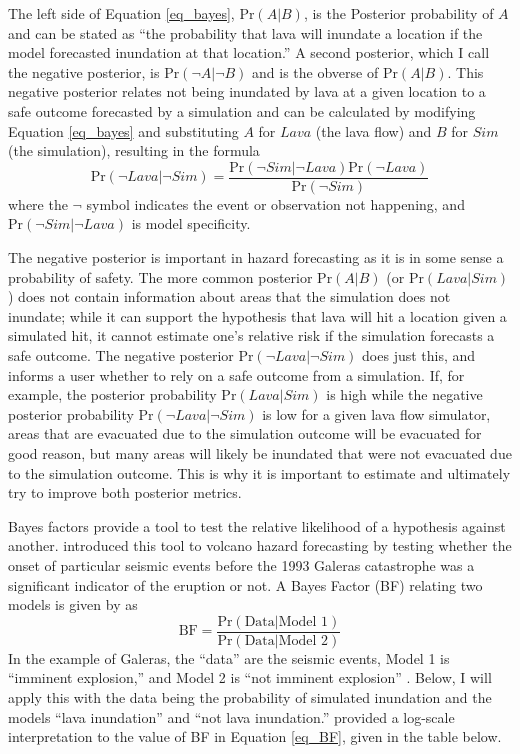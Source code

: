 \documentclass[12pt,letter]{article}
\begin{document}
	The left side of Equation \ref{eq_bayes}, $\text{Pr}(A|B)$, is the Posterior probability of $A$ and can be stated as ``the probability that lava will inundate a location if the model forecasted inundation at that location.'' A second posterior, which I call the negative posterior, is $\text{Pr}(\neg A|\neg B)$ and is the obverse of $\text{Pr}(A|B)$. This negative posterior relates not being inundated by lava at a given location to a safe outcome forecasted by a simulation and can be calculated by modifying Equation \ref{eq_bayes} and substituting $A$ for $Lava$ (the lava flow) and $B$ for $Sim$ (the simulation), resulting in the formula
	\begin{equation}
		\text{Pr}(\neg Lava|\neg Sim)=\frac{\text{Pr}(\neg Sim|\neg Lava)\text{Pr}(\neg Lava)}{\text{Pr}(\neg Sim)}
	\end{equation}
	where the $\neg$ symbol indicates the event or observation not happening, and $\text{Pr}(\neg Sim|\neg Lava)$ is model specificity.
	
	The negative posterior is important in hazard forecasting as it is in some sense a probability of safety. The more common posterior $\text{Pr}(A|B)$ (or $\text{Pr}(Lava|Sim)$) does not contain information about areas that the simulation does not inundate; while it can support the hypothesis that lava will hit a location given a simulated hit, it cannot estimate one's relative risk if the simulation forecasts a safe outcome. The negative posterior $\text{Pr}(\neg Lava|\neg Sim)$ does just this, and informs a user whether to rely on a safe outcome from a simulation. If, for example, the posterior probability $\text{Pr}(Lava|Sim)$ is high while the negative posterior probability $\text{Pr}(\neg Lava|\neg Sim)$ is low for a given lava flow simulator, areas that are evacuated due to the simulation outcome will be evacuated for good reason, but many areas will likely be inundated that were not evacuated due to the simulation outcome. This is why it is important to estimate and ultimately try to improve both posterior metrics.
	
	Bayes factors provide a tool to test the relative likelihood of a hypothesis against another. \citet{aspinall2003evidence} introduced this tool to volcano hazard forecasting by testing whether the onset of particular seismic events before the 1993 Galeras catastrophe was a significant indicator of the eruption or not. A Bayes Factor (BF) relating two models is given by \citet{jeffreys1961theory} as
	\begin{equation}
		\text{BF} = \frac{\text{Pr}(\text{Data}|\text{Model~1})}{\text{Pr}(\text{Data}|\text{Model~2})}
		\label{eq_BF}
	\end{equation}
	In the example of Galeras, the ``data'' are the seismic events, Model 1 is ``imminent explosion,'' and Model 2 is ``not imminent explosion'' \citep{aspinall2003evidence}. Below, I will apply this with the data being the probability of simulated inundation and the models ``lava inundation'' and ``not lava inundation.'' \citet{jeffreys1961theory} provided a log-scale interpretation to the value of BF in Equation \ref{eq_BF}, given in the table below.
	
\end{document}
